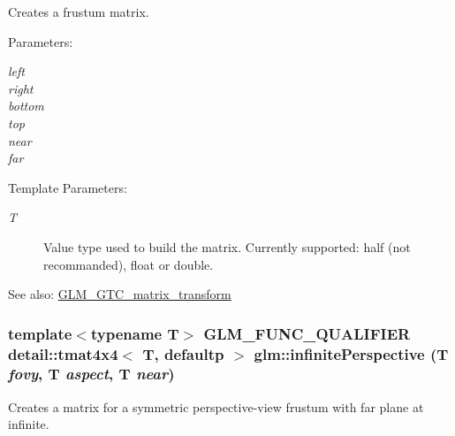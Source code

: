 Creates a frustum matrix.

\begin{Desc}
\item[Parameters:]
\begin{description}
\item[{\em left}]\item[{\em right}]\item[{\em bottom}]\item[{\em top}]\item[{\em near}]\item[{\em far}]\end{description}
\end{Desc}
\begin{Desc}
\item[Template Parameters:]
\begin{description}
\item[{\em T}]Value type used to build the matrix. Currently supported: half (not recommanded), float or double. \end{description}
\end{Desc}
\begin{Desc}
\item[See also:]\hyperlink{group__gtc__matrix__transform}{GLM\_\-GTC\_\-matrix\_\-transform} \end{Desc}
\hypertarget{group__gtc__matrix__transform_g2b5303a99580dc5a2ffe4cd9303397a9}{
\subsubsection[infinitePerspective]{\setlength{\rightskip}{0pt plus 5cm}template$<$typename T$>$ GLM\_\-FUNC\_\-QUALIFIER detail::tmat4x4$<$ T, defaultp $>$ glm::infinitePerspective (T {\em fovy}, \/  T {\em aspect}, \/  T {\em near})}}
\label{group__gtc__matrix__transform_g2b5303a99580dc5a2ffe4cd9303397a9}


Creates a matrix for a symmetric perspective-view frustum with far plane at infinite.

